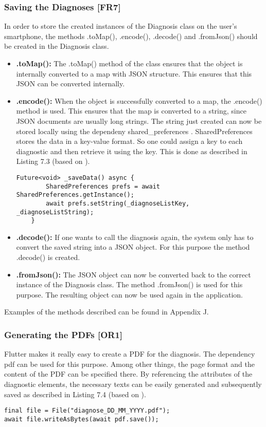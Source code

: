 \subsubsection{Saving the Diagnoses [FR7]}
In order to store the created instances of the Diagnosis class on the user's smartphone, the methods .toMap(), .encode(), .decode() and .fromJson() should be created in the Diagnosis class.
\begin{itemize}
	\item \textbf{.toMap():}
	\newline
	The .toMap() method of the class ensures that the object is internally converted to a map with JSON structure. This ensures that this JSON can be converted internally.
	\item \textbf{.encode():}
	\newline
	When the object is successfully converted to a map, the .encode() method is used. This ensures that the map is converted to a string, since JSON documents are usually long strings. 
	The string just created can now be stored locally using the dependeny shared\_preferences \cite{.sharedpref}. SharedPreferences stores the data in a key-value format. So one could assign a key to each diagnostic and then retrieve it using the key. This is done as described in Listing 7.3 (based on \cite{.usesharedpref}). 
	\scriptsize
	\begin{lstlisting}[caption=Storing Data to Locally with SharedPreferences]
	  Future<void> _saveData() async {
		SharedPreferences prefs = await SharedPreferences.getInstance();
		await prefs.setString(_diagnoseListKey, _diagnoseListString);
	}
	\end{lstlisting}
	\normalsize
	\item \textbf{.decode():}
	\newline
	If one wants to call the diagnosis again, the system only has to convert the saved string into a JSON object. For this purpose the method .decode() is created. 
	\item \textbf{.fromJson():}
	\newline
	The JSON object can now be converted back to the correct instance of the Diagnosis class. The method .fromJson() is used for this purpose. The resulting object can now be used again in the application.
\end{itemize}
Examples of the methods described can be found in Appendix J.
\subsubsection{Generating the PDFs [OR1]}
Flutter makes it really easy to create a PDF for the diagnosis. The dependency pdf can be used for this purpose. Among other things, the page format and the content of the PDF can be specified there. By referencing the attributes of the diagnostic elements, the necessary texts can be easily generated and subsequently saved as described in Listing 7.4 (based on \cite{.pdf}).
	\scriptsize
\begin{lstlisting}[caption=Saving a PDF]
final file = File("diagnose_DD_MM_YYYY.pdf");
await file.writeAsBytes(await pdf.save());
\end{lstlisting}
\normalsize

